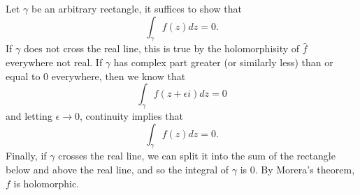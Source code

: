 \documentclass{homework}
\begin{document}
\begin{solution}
                                                                                                                                                                                                                                                                                                        Let $\gamma$ be an arbitrary rectangle, it suffices to show that
                                                                                                                                                                                                                                                                                                        \[\int_{\gamma} f(z)dz = 0.\]
                                                                                                                                                                                                                                                                                                        If $\gamma$ does not cross the real line, this is true by the holomorphisity of $\hat{f}$ everywhere not real. If $\gamma$ has complex part greater (or similarly less) than or equal to 0 everywhere, then we know that
                                                                                                                                                                                                                                                                                                        \[\int_{\gamma} f(z+\epsilon i)dz = 0\]
                                                                                                                                                                                                                                                                                                        and letting $\epsilon\to 0$, continuity implies that
                                                                                                                                                                                                                                                                                                        \[\int_{\gamma} f(z)dz = 0.\]
                                                                                                                                                                                                                                                                                                        Finally, if $\gamma$ crosses the real line, we can split it into the sum of the rectangle below and above the real line, and so the integral of $\gamma$ is 0. By Morera's theorem, $f$ is holomorphic.
                                                                                                                                                                                                                                                                                                        \end{solution}
\end{document}
